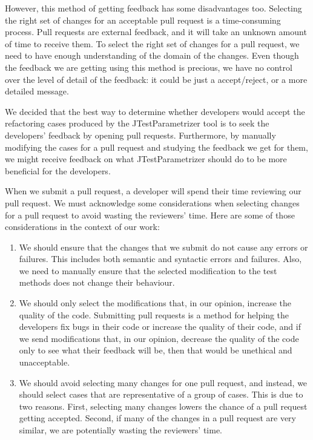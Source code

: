 However, this method of getting feedback has some disadvantages too. Selecting the right set of changes for an acceptable pull request is a time-consuming process. Pull requests are external feedback, and it will take an unknown amount of time to receive them. To select the right set of changes for a pull request, we need to have enough understanding of the domain of the changes. Even though the feedback we are getting using this method is precious, we have no control over the level of detail of the feedback: it could be just a accept/reject, or a more detailed message.

We decided that the best way to determine whether developers would accept the refactoring cases produced by the JTestParametrizer tool is to seek the developers' feedback by opening pull requests. Furthermore, by manually modifying the cases for a pull request and studying the feedback we get for them, we might receive feedback on what JTestParametrizer should do to be more beneficial for the developers.

When we submit a pull request, a developer will spend their time reviewing our pull request. We must acknowledge some considerations when selecting changes for a pull request to avoid wasting the reviewers' time. Here are some of those considerations in the context of our work:

\begin{enumerate}

  \item We should ensure that the changes that we submit do not cause any errors or failures. This includes both semantic and syntactic errors and failures. Also, we need to manually ensure that the selected modification to the test methods does not change their behaviour.

  \item \label{item:min-quality} We should only select the modifications that, in our opinion, increase the quality of the code. Submitting pull requests is a method for helping the developers fix bugs in their code or increase the quality of their code, and if we send modifications that, in our opinion, decrease the quality of the code only to see what their feedback will be, then that would be unethical and unacceptable.

  \item \label{item:representative} We should avoid selecting many changes for one pull request, and instead, we should select cases that are representative of a group of cases. This is due to two reasons. First, selecting many changes lowers the chance of a pull request getting accepted. Second, if many of the changes in a pull request are very similar, we are potentially wasting the reviewers' time.
  
\end{enumerate}

